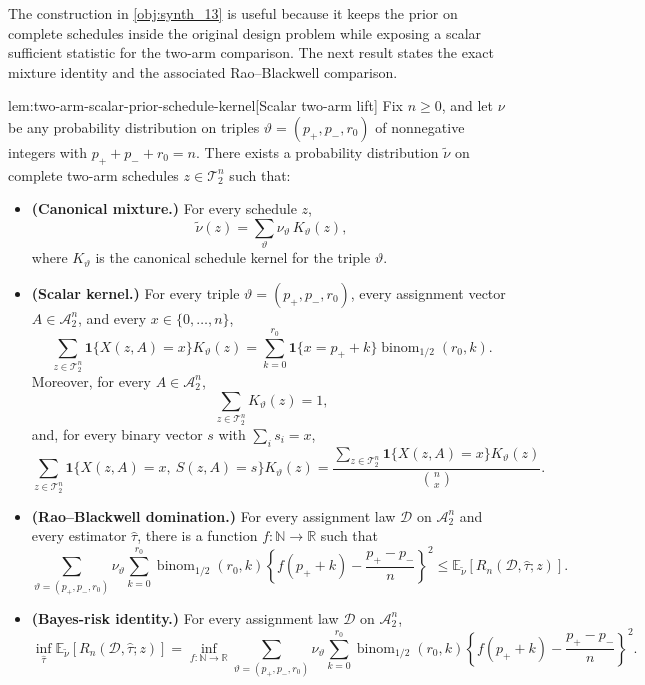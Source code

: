 The construction in \cref{obj:synth_13} is useful because it keeps the prior on complete schedules inside the original design problem while exposing a scalar sufficient statistic for the two-arm comparison. The next result states the exact mixture identity and the associated Rao--Blackwell comparison.

\begin{lemmav}{lem:two-arm-scalar-prior-schedule-kernel}[Scalar two-arm lift]
Fix \(n\ge 0\), and let \(\nu\) be any probability distribution on triples
\(\vartheta=(p_+,p_-,r_0)\) of nonnegative integers with
\(p_++p_-+r_0=n\).  There exists a probability distribution \(\widetilde\nu\)
on complete two-arm schedules \(z\in\mathcal T_2^n\) such that:
\begin{itemize}
\item \textbf{(Canonical mixture.)} For every schedule \(z\),
\[
\widetilde\nu(z)
=
\sum_{\vartheta}\nu_\vartheta\,K_\vartheta(z),
\]
where \(K_\vartheta\) is the canonical schedule kernel for the triple
\(\vartheta\).

\item \textbf{(Scalar kernel.)} For every triple
\(\vartheta=(p_+,p_-,r_0)\), every assignment vector
\(A\in\mathcal A_2^n\), and every \(x\in\{0,\ldots,n\}\),
\[
\sum_{z\in\mathcal T_2^n}
\mathbf 1\{X(z,A)=x\}K_\vartheta(z)
=
\sum_{k=0}^{r_0}
\mathbf 1\{x=p_+ + k\}\operatorname{binom}_{1/2}(r_0,k).
\]
Moreover, for every \(A\in\mathcal A_2^n\),
\[
\sum_{z\in\mathcal T_2^n} K_\vartheta(z)=1,
\]
and, for every binary vector \(s\) with \(\sum_i s_i=x\),
\[
\sum_{z\in\mathcal T_2^n}
\mathbf 1\{X(z,A)=x,\ S(z,A)=s\}K_\vartheta(z)
=
\frac{
\sum_{z\in\mathcal T_2^n}\mathbf 1\{X(z,A)=x\}K_\vartheta(z)
}{
\binom{n}{x}
}.
\]

\item \textbf{(Rao--Blackwell domination.)} For every assignment law
\(\mathcal D\) on \(\mathcal A_2^n\) and every estimator
\(\widehat\tau\), there is a function \(f:\mathbb N\to\mathbb R\) such that
\[
\sum_{\vartheta=(p_+,p_-,r_0)}
\nu_\vartheta
\sum_{k=0}^{r_0}
\operatorname{binom}_{1/2}(r_0,k)
\left\{
f(p_+ + k)-\frac{p_+-p_-}{n}
\right\}^2
\le
\mathbb E_{\widetilde\nu}
\!\left[
R_n(\mathcal D,\widehat\tau;z)
\right].
\]

\item \textbf{(Bayes-risk identity.)} For every assignment law
\(\mathcal D\) on \(\mathcal A_2^n\),
\[
\inf_{\widehat\tau}
\mathbb E_{\widetilde\nu}
\!\left[
R_n(\mathcal D,\widehat\tau;z)
\right]
=
\inf_{f:\mathbb N\to\mathbb R}
\sum_{\vartheta=(p_+,p_-,r_0)}
\nu_\vartheta
\sum_{k=0}^{r_0}
\operatorname{binom}_{1/2}(r_0,k)
\left\{
f(p_+ + k)-\frac{p_+-p_-}{n}
\right\}^2 .
\]
\end{itemize}
\end{lemmav}

